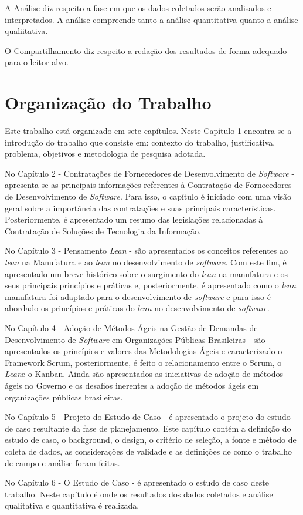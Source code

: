 A Análise diz respeito a fase em que os dados coletados serão analisados e interpretados. A análise compreende tanto a análise quantitativa quanto a análise qualiitativa.

O Compartilhamento diz respeito a redação dos resultados de forma adequado para o leitor alvo.

\section[Organização do Trabalho]{Organização do Trabalho}

Este trabalho está organizado em sete capítulos. Neste Capítulo 1 encontra-se a introdução do trabalho que consiste em: contexto do trabalho,  justificativa,  problema, objetivos e metodologia de pesquisa adotada.

No Capítulo 2 - Contratações de Fornecedores de Desenvolvimento de \textit{Software} - apresenta-se as principais informações referentes à Contratação de Fornecedores de Desenvolvimento de \textit{Software}. Para isso, o capítulo é iniciado com uma visão geral sobre a importância das contratações e suas principais características. Posteriormente, é apresentado um resumo das legislações relacionadas à Contratação de Soluções de Tecnologia da Informação.

No Capítulo 3 - Pensamento \textit{Lean} - são apresentados os conceitos referentes ao \textit{lean} na Manufatura e ao \textit{lean} no desenvolvimento de \textit{software}. Com este fim, é apresentado um breve histórico sobre o surgimento do \textit{lean} na manufatura e os seus principais princípios e práticas e, posteriormente, é apresentado como o \textit{lean} manufatura foi adaptado para o desenvolvimento de \textit{software} e para isso é abordado os princípios e práticas do \textit{lean} no desenvolvimento de \textit{software}.

No Capítulo 4  - Adoção de Métodos Ágeis na Gestão de Demandas de Desenvolvimento de \textit{Software} em Organizações Públicas Brasileiras - são apresentados os princípios e valores das Metodologias Ágeis e caracterizado o Framework Scrum, posteriormente, é feito o relacionamento entre o Scrum, o \textit{Lean}e o Kanban. Ainda são apresentados as iniciativas de adoção de métodos ágeis no Governo e os desafios inerentes a adoção de métodos ágeis em organizações públicas brasileiras.

No Capítulo 5 - Projeto do Estudo de Caso - é apresentado o projeto do estudo de caso resultante da fase de planejamento. Este capítulo contém a definição do estudo de caso, o background, o design, o critério de seleção, a fonte e método de coleta de dados, as considerações de validade e as definições de como o trabalho de campo e análise foram feitas.

No Capítulo 6 -  O Estudo de Caso - é apresentado o estudo de caso deste trabalho. Neste capítulo é onde os resultados dos dados coletados e análise qualitativa e quantitativa é realizada. 